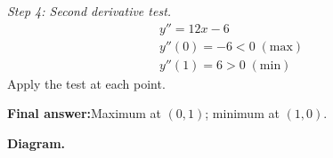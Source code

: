 \documentclass[11pt]{article}
\begin{document}
\textit{Step 4: Second derivative test.}
\[\begin{gathered}
y'' = 12x - 6 \\ y''(0) = -6 < 0\; (\text{max}) \\ y''(1) = 6 > 0\; (\text{min})
\end{gathered}\]
Apply the test at each point.

\begin{answerbox}
\textbf{Final answer:}\quad Maximum at \(\displaystyle  (0, 1) \); minimum at \(\displaystyle  (1, 0) \).
\end{answerbox}
\textbf{Diagram.}

\begin{center}
\end{center}
\end{document}
